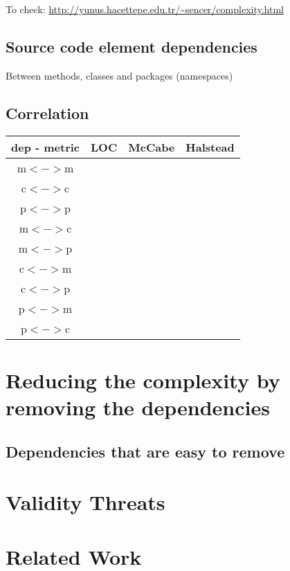 \documentclass{sig-alternate}
\begin{document}
To check: \url{http://yunus.hacettepe.edu.tr/~sencer/complexity.html}
\subsection{Source code element dependencies}

Between methods, classes and packages (namespaces)

\subsection{Correlation}

\begin{tabular}{|c|c|c|c|}\hline
dep - metric  & LOC & McCabe & Halstead\\\hline
m$<->$m	&	& & \\\hline
c$<->$c	&	& & \\\hline
p$<->$p	&	& & \\\hline
m$<->$c	&	& & \\\hline
m$<->$p	&	& & \\\hline
c$<->$m	&	& & \\\hline
c$<->$p	&	& & \\\hline
p$<->$m	&	& & \\\hline
p$<->$c	&	& & \\\hline
\end{tabular}



\section{Reducing the complexity by removing the dependencies}

\subsection{Dependencies that are easy to remove}

\section{Validity Threats}



\section{Related Work}
\end{document}
